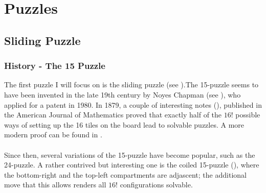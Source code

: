 
\chapter{Puzzles} %

\label{sec:Puzzles} %

\section{Sliding Puzzle}


\subsection{History - The 15 Puzzle}


The first puzzle I will focus on is the sliding puzzle (see \cite{SlidingPuzzleWiki}).The 15-puzzle seems to have been invented in the late 19th century by Noyes Chapman (see \cite{SlidingPuzzleWolfram}), who applied for a patent in 1980. In 1879, a couple of interesting notes (\cite{Johnson1879}), published in the American Journal of Mathematics proved that exactly half of the $16!$ possible ways of setting up the 16 tiles on the board lead to solvable puzzles. A more modern proof can be found in \cite{Archer1999}.
\\
\\
Since then, several variations of the 15-puzzle have become popular, such as the 24-puzzle. A rather contrived but interesting one is the coiled 15-puzzle (\cite{Coiled15Puzzle}), where the bottom-right and the top-left compartments are adjascent; the additional move that this allows renders all $16!$ configurations solvable. 



